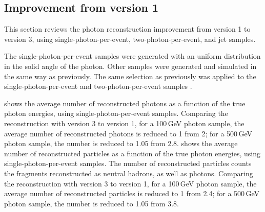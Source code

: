 \subsection{Improvement from \pandora version 1}
\label{sec:photonPerformanceCompare}

This section reviews the photon reconstruction improvement  from \pandora version 1 to version 3, using single-photon-per-event, two-photon-per-event, and jet samples.



The single-photon-per-event samples were generated with an uniform distribution in the solid angle of the photon. Other samples were generated and simulated in the same way as previously. The same selection as previously was applied to the  single-photon-per-event and  two-photon-per-event samples .

 shows the average number of reconstructed photons as a function of the true photon energies, using single-photon-per-event samples. Comparing the reconstruction with \pandora version 3 to version 1, for a 100\,GeV photon sample, the average number of reconstructed photons is reduced to 1 from 2; for a 500\,GeV photon sample, the  number is reduced to 1.05 from 2.8.  shows the average number of reconstructed particles as a function of the true photon energies, using single-photon-per-event samples. The number of  reconstructed particles counts the fragments reconstructed as neutral hadrons, as well as photons.   Comparing the reconstruction with \pandora version 3 to version 1,  for a 100\,GeV photon sample, the average number of reconstructed particles is reduced to 1 from 2.4; for a 500\,GeV photon sample, the number is reduced to 1.05 from 3.8.


